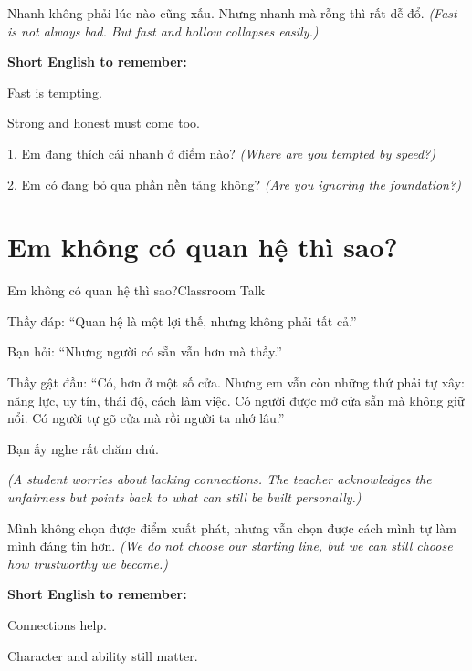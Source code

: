 \begin{baihoc}
Nhanh không phải lúc nào cũng xấu. Nhưng nhanh mà rỗng thì rất dễ đổ.
\textit{(Fast is not always bad. But fast and hollow collapses easily.)}
\end{baihoc}

\begin{ghinhoanh}
\textbf{Short English to remember:}

Fast is tempting.

Strong and honest must come too.
\end{ghinhoanh}

\begin{tuhocnhanh}
1. Em đang thích cái nhanh ở điểm nào? \textit{(Where are you tempted by speed?)}

2. Em có đang bỏ qua phần nền tảng không? \textit{(Are you ignoring the foundation?)}
\end{tuhocnhanh}
\ngancach

\section{Em không có quan hệ thì sao?}
\begin{truyen}{Em không có quan hệ thì sao?}{Classroom Talk}

Thầy đáp: ``Quan hệ là một lợi thế, nhưng không phải tất cả.''

Bạn hỏi: ``Nhưng người có sẵn vẫn hơn mà thầy.''

Thầy gật đầu: ``Có, hơn ở một số cửa. Nhưng em vẫn còn những thứ phải tự xây: năng lực, uy tín, thái độ, cách làm việc. Có người được mở cửa sẵn mà không giữ nổi. Có người tự gõ cửa mà rồi người ta nhớ lâu.''

Bạn ấy nghe rất chăm chú.

\textit{(A student worries about lacking connections. The teacher acknowledges the unfairness but points back to what can still be built personally.)}
\end{truyen}

\begin{baihoc}
Mình không chọn được điểm xuất phát, nhưng vẫn chọn được cách mình tự làm mình đáng tin hơn.
\textit{(We do not choose our starting line, but we can still choose how trustworthy we become.)}
\end{baihoc}

\begin{ghinhoanh}
\textbf{Short English to remember:}

Connections help.

Character and ability still matter.
\end{ghinhoanh}

